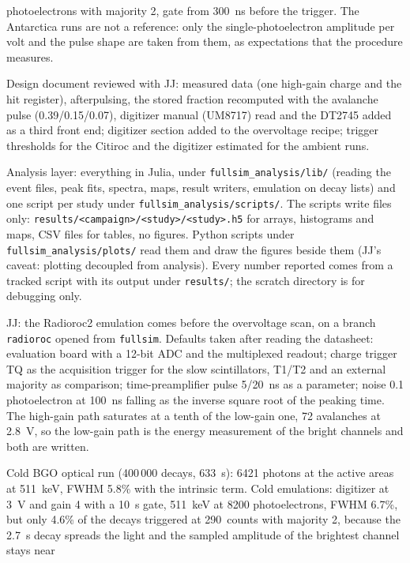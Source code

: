 \documentclass[11pt]{article}
\newcommand{\code}[1]{\texttt{#1}}
\newcommand{\us}{\textmu s\xspace}
\begin{document}
\begin{description}
  photoelectrons with majority 2, gate from 300~ns before the trigger. The
  Antarctica runs are not a reference: only the single-photoelectron
  amplitude per volt and the pulse shape are taken from them, as
  expectations that the procedure measures.
\item[16 Oct 2026] Design document reviewed with JJ: measured data (one
  high-gain charge and the hit register), afterpulsing, the stored fraction
  recomputed with the avalanche pulse (0.39/0.15/0.07), digitizer manual
  (UM8717) read and the DT2745 added as a third front end; digitizer section
  added to the overvoltage recipe; trigger thresholds for the Citiroc and
  the digitizer estimated for the ambient runs.
\item[17 Oct 2026] Analysis layer: everything in Julia, under
  \code{fullsim\_analysis/lib/} (reading the event files, peak fits,
  spectra, maps, result writers, emulation on decay lists) and one script
  per study under \code{fullsim\_analysis/scripts/}. The scripts write
  files only: \code{results/<campaign>/<study>/<study>.h5} for arrays,
  histograms and maps, CSV files for tables, no figures. Python scripts
  under \code{fullsim\_analysis/plots/} read them and draw the figures
  beside them (JJ's caveat: plotting decoupled from analysis). Every
  number reported comes from a tracked script with its output under
  \code{results/}; the scratch directory is for debugging only.
\item[17 Oct 2026] JJ: the Radioroc2 emulation comes before the overvoltage
  scan, on a branch \code{radioroc} opened from \code{fullsim}. Defaults
  taken after reading the datasheet: evaluation board with a 12-bit ADC
  and the multiplexed readout; charge trigger TQ as the acquisition
  trigger for the slow scintillators, T1/T2 and an external majority as
  comparison; time-preamplifier pulse 5/20~ns as a parameter; noise 0.1
  photoelectron at 100~ns falling as the inverse square root of the
  peaking time. The high-gain path saturates at a tenth of the low-gain
  one, 72 avalanches at 2.8~V, so the low-gain path is the energy
  measurement of the bright channels and both are written.
\item[18 Oct 2026] Cold BGO optical run (400\,000 decays, 633~s): 6421
  photons at the active areas at 511~keV, FWHM 5.8\% with the intrinsic
  term. Cold emulations: digitizer at 3~V and gain 4 with a 10~\us gate,
  511~keV at 8200 photoelectrons, FWHM 6.7\%, but only 4.6\% of the decays
  triggered at 290~counts with majority 2, because the 2.7~\us decay spreads
  the light and the sampled amplitude of the brightest channel stays near

\end{description}
\end{document}
